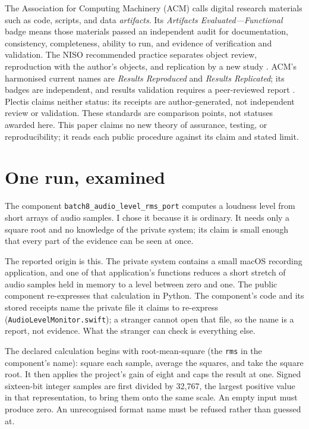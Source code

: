 \documentclass[11pt]{article}
\newcommand{\code}[1]{\texttt{#1}}
\newcommand{\component}[1]{\nolinkurl{#1}}
\begin{document}
The Association for Computing Machinery (ACM) calls digital research materials
such as code, scripts, and data
\emph{artifacts}. Its \emph{Artifacts Evaluated---Functional} badge means
those materials passed an independent audit for documentation, consistency,
completeness, ability to run, and evidence of verification and validation.
The NISO recommended practice separates object review, reproduction with the
author's objects, and replication by a new study
\cite[secs.~2.2--2.4]{nisobadging2021}. ACM's harmonised current names are
\emph{Results Reproduced} and \emph{Results Replicated}; its badges are
independent, and results validation requires a peer-reviewed report
\cite{acmartifact}. Plectis claims neither status: its receipts are
author-generated, not independent review or validation. These standards are
comparison points, not statuses awarded here. This paper claims no new theory of
assurance, testing, or reproducibility; it reads each public procedure against
its claim and stated limit.

\section{One run, examined}
\label{sec:run}

The component \component{batch8_audio_level_rms_port} computes a loudness
level from short arrays of audio samples. I chose it because it is ordinary.
It needs only a square root and no knowledge of the private system; its claim
is small enough that every part of the evidence can be seen at once.

The reported origin is this. The private system contains a small macOS
recording application, and one of that application's functions reduces a
short stretch of audio samples held in memory to a level between zero and
one. The public
component re-expresses that calculation in Python. The component's code and
its stored receipts name the private file it claims to re-express
(\component{AudioLevelMonitor.swift}); a stranger cannot open that file, so
the name is a report, not evidence. What the stranger can check is
everything else.

The declared calculation begins with root-mean-square (the \code{rms} in
the component's name): square each sample, average the squares, and take
the square root. It then applies the project's gain of eight and caps the
result at one. Signed sixteen-bit integer samples are first divided by
32{,}767, the largest positive value in that representation, to bring them
onto the same scale. An empty input must produce zero. An unrecognised
format name must be refused rather than guessed at.
\end{document}
